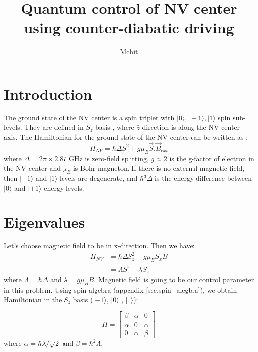 \documentclass[11pt,a4paper]{article}
\author{Mohit}
\title{Quantum control of NV center using counter-diabatic driving  }
\begin{document}
\maketitle

\section{Introduction}
The ground state of the NV center is a spin triplet with $| 0 \rangle, | -1 \rangle, | 1 \rangle$ spin sub-levels. They are defined in $S_z$ basis , where $\hat{z}$ direction is along the NV center axis. The Hamiltonian for the ground state of the NV center can be written as \cite{dhingra2017nitrogen}:
\begin{equation}
H_{NV}= \hbar \Delta S_z^2 + g \mu_B \vec{S}. \vec{B}_{ext} 
\end{equation}
where $\Delta= 2 \pi \times 2.87 $ GHz is zero-field splitting, $g \approx 2$ is the g-factor of electron in the NV center and $\mu_B$ is Bohr magneton. If there is no external magnetic field, then $| -1 \rangle$ and $| 1 \rangle$ levels are degenerate, and  $ \hbar^3 \Delta$ is the energy difference between $| 0 \rangle$ and $| \pm 1 \rangle$ energy levels.

\section{Eigenvalues}

Let's choose magnetic field to be in x-direction. Then we have:
\begin{align*}
H_{NV} &= \hbar \Delta S_z^2 + g \mu_B   S_x  B \\
 &= \Lambda S_z^2 + \lambda   S_x  
\end{align*}
where $\Lambda= \hbar \Delta $ and $\lambda=g \mu_B    B $. Magnetic field is going to be our control parameter in this problem. Using spin algebra  (appendix \ref{sec.spin_alegbra}), we obtain Hamiltonian in the $S_z$ basis ($|- 1\rangle$, $| 0 \rangle$ , $| 1 \rangle$):

\begin{equation}
H= \begin{bmatrix}
    \beta       & \alpha  & 0  \\
    \alpha       & 0 &\alpha  \\
     0       & \alpha & \beta
\end{bmatrix}
\end{equation}
where $\alpha= \hbar \lambda/ \sqrt{2} $ and $\beta= \hbar^2 \Lambda$.
\end{document}
